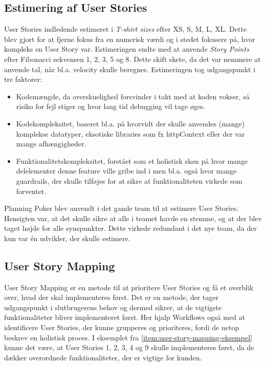 \subsection{Estimering af User Stories}
User Stories indledende estimeret i \emph{T-shirt sizes} efter XS, S, M, L, XL. Dette blev gjort for at fjerne fokus fra en numerisk værdi og i stedet fokusere på, hvor kompleks en User Story var.
Estimeringen endte med at anvende \emph{Story Points} efter Fibonacci sekvensen 1, 2, 3, 5 og 8. Dette skift skete, da det var nemmere at anvende tal, når bl.a. velocity skulle beregnes.
Estimeringen tog udgangspunkt i tre faktorer:
\begin{itemize}
    \item Kodemængde, da overskuelighed forsvinder i takt med at koden vokser, så risiko for fejl stiger og hvor lang tid debugging vil tage øges.
    \item Kodekompleksitet, baseret bl.a. på hvorvidt der skulle anvendes (mange) komplekse datatyper, eksotiske libraries som fx httpContext eller der var mange afhængigheder.
    \item Funktionalitetskompleksitet, forstået som et holistisk skøn på hvor mange delelementer denne feature ville gribe ind i men bl.a. også hvor mange guardrails, der skulle tilføjes for at sikre at funktionaliteten virkede som forventet.
\end{itemize}
Planning Poker blev anvendt i det gamle team til at estimere User Stories. Hensigten var, at det skulle sikre at alle i teamet havde en stemme, og at der blev taget højde for alle synspunkter.
Dette virkede redundant i det nye team, da der kun var én udvikler, der skulle estimere.

\subsection{User Story Mapping}
User Story Mapping er en metode til at prioritere User Stories og få et overblik over, hvad der skal implementeres først.
Det er en metode, der tager udgangspunkt i slutbrugerens behov og dermed sikrer, at de vigtigste funktionaliteter bliver implementeret først.
Her hjalp Workflows også med at identificere User Stories, der kunne grupperes og prioriteres, fordi de netop beskrev en holistisk proces.
I eksemplet fra \ref{item:user-story-mapping-eksempel} kunne det være, at User Stories 1, 2, 3, 4 og 9 skulle implementeres først, da de dækker overordnede funktionaliteter, der er vigtige for kunden.

